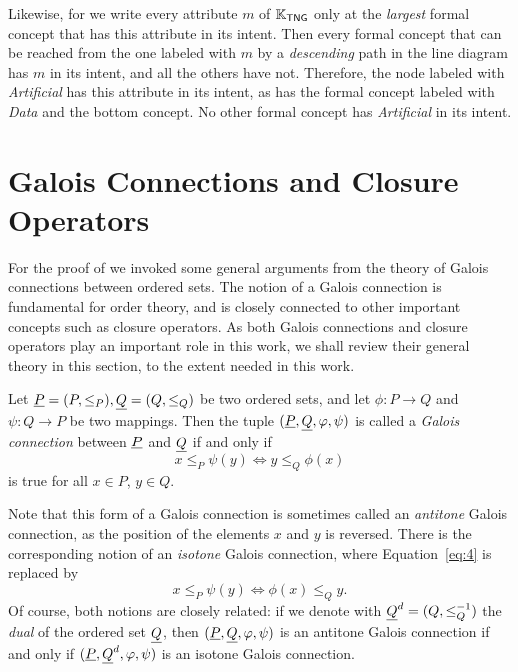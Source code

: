 \begin{Example}
  Likewise, for we write every attribute $m$ of ${\mathbb{K}}_{\mathsf{TNG}}$ only at the
  \emph{largest} formal concept that has this attribute in its intent.  Then every formal
  concept that can be reached from the one labeled with $m$ by a \emph{descending} path in
  the line diagram has $m$ in its intent, and all the others have not.  Therefore, the
  node labeled with \emph{Artificial} has this attribute in its intent, as has the formal
  concept labeled with \emph{Data} and the bottom concept.  No other formal concept has
  \emph{Artificial} in its intent.
\end{Example}

\section{Galois Connections and Closure Operators}
\label{sec:galois-connections}

For the proof of  we invoked some general
arguments from the theory of Galois connections between ordered sets.  The notion of a
Galois connection is fundamental for order theory, and is closely connected to other
important concepts such as closure operators.  As both Galois connections and closure
operators play an important role in this work, we shall review their general theory in
this section, to the extent needed in this work.

\begin{Definition}
  \label{def:galois-connection}
  Let ${\underline{P}} = (P, \leq_P), {\underline{Q}} = (Q, \leq_Q)$ be two ordered sets, and let $\phi
  \colon P \to Q$ and $\psi \colon Q \to P$ be two mappings.  Then the tuple $({\underline{P}},
  {\underline{Q}}, \varphi, \psi)$ is called a \emph{Galois connection} between ${\underline{P}}$ and ${\underline{Q}}$
  if and only if
  \begin{equation}
    \label{eq:4}
    x \leq_P \psi(y) \iff y \leq_Q \phi(x)
  \end{equation}
  is true for all $x \in P$, $y \in Q$.
\end{Definition}

Note that this form of a Galois connection is sometimes called an \emph{antitone} Galois
connection, as the position of the elements $x$ and $y$ is reversed.  There is the
corresponding notion of an \emph{isotone} Galois connection, where Equation~\eqref{eq:4}
is replaced by
\begin{equation}
  \label{eq:5}
  x \leq_P \psi(y) \iff \phi(x) \leq_Q y.
\end{equation}
Of course, both notions are closely related: if we denote with ${\underline{Q}}^d = (Q,
\leq_Q^{-1})$ the \emph{dual} of the ordered set ${\underline{Q}}$, then $({\underline{P}}, {\underline{Q}}, \varphi,
\psi)$ is an antitone Galois connection if and only if $({\underline{P}}, {\underline{Q}}^d, \varphi, \psi)$ is
an isotone Galois connection.

